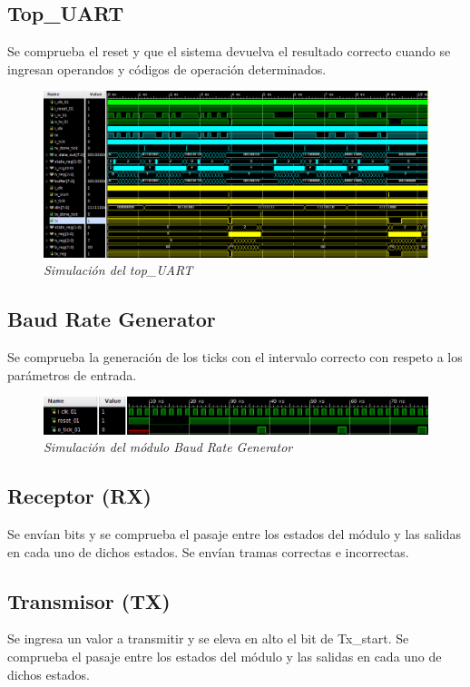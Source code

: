 \documentclass[12pt,A4paper,titlepage]{article}
\begin{document}
\subsection{Top\_UART}
Se comprueba el reset y que el sistema devuelva el resultado correcto cuando se ingresan operandos y códigos de operación determinados.
\begin{figure}[h]
    \centering
    \includegraphics[width=\textwidth]{figure/top_uart.png}
    \caption{\textit{Simulación del top\_UART}}
    \label{fig:tb_top}
\end{figure}

\subsection{Baud Rate Generator}
Se comprueba la generación de los ticks con el intervalo correcto con respeto a los parámetros de entrada.

\begin{figure}[H]
    \centering
    \includegraphics[width=\textwidth]{figure/tb_brg.png}
    \caption{\textit{Simulación del módulo Baud Rate Generator}}
    \label{fig:tb_brg}
\end{figure}

\subsection{Receptor (RX)}
Se envían bits y se comprueba el pasaje entre los estados del módulo y las salidas en cada uno de dichos estados. Se envían tramas correctas e incorrectas.

\subsection{Transmisor (TX)}
Se ingresa un valor a transmitir y se eleva en alto el bit de Tx\_start. Se comprueba el pasaje entre los estados del módulo y las salidas en cada uno de dichos estados.
\end{document}
